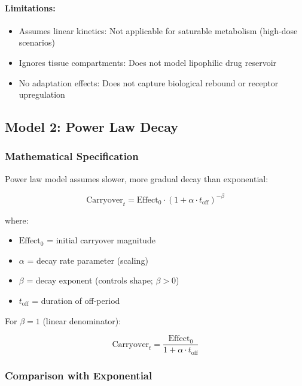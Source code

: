 \documentclass[11pt,a4paper]{article}
\begin{document}
\paragraph{Limitations:}
\begin{itemize}
  \item Assumes linear kinetics: Not applicable for saturable metabolism (high-dose scenarios)
  \item Ignores tissue compartments: Does not model lipophilic drug reservoir
  \item No adaptation effects: Does not capture biological rebound or receptor upregulation
\end{itemize}

\subsection{Model 2: Power Law Decay}
\label{subsec:powerlaw}

\subsubsection{Mathematical Specification}

Power law model assumes slower, more gradual decay than exponential:

\begin{equation}
  \text{Carryover}_t = \text{Effect}_0 \cdot (1 + \alpha \cdot t_{\text{off}})^{-\beta}
\end{equation}

where:
\begin{itemize}
  \item $\text{Effect}_0$ = initial carryover magnitude
  \item $\alpha$ = decay rate parameter (scaling)
  \item $\beta$ = decay exponent (controls shape; $\beta > 0$)
  \item $t_{\text{off}}$ = duration of off-period
\end{itemize}

For $\beta = 1$ (linear denominator):

\begin{equation}
  \text{Carryover}_t = \frac{\text{Effect}_0}{1 + \alpha \cdot t_{\text{off}}}
\end{equation}

\subsubsection{Comparison with Exponential}
\end{document}
